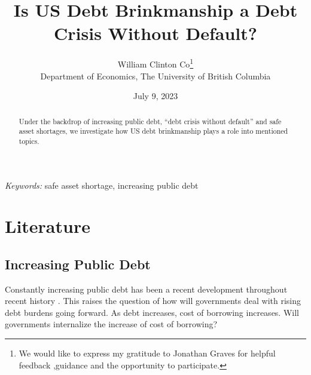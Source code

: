 \documentclass[
  12pt]{article}
\begin{document}
\def\spacingset#1{\renewcommand{\baselinestretch}%
{#1}\small\normalsize} \spacingset{1}



\date{July 9, 2023}
\title{\bf Is US Debt Brinkmanship a Debt Crisis Without Default?}
\author{
William Clinton Co\thanks{We would like to express my gratitude to
Jonathan Graves for helpful feedback ,guidance and the opportunity to
participate.}\\
Department of Economics, The University of British Columbia\\
}
\maketitle

\bigskip
\bigskip
\begin{abstract}
Under the backdrop of increasing public debt, ``debt crisis without
default'' and safe asset shortages, we investigate how US debt
brinkmanship plays a role into mentioned topics.
\end{abstract}

\noindent%
{\it Keywords:} safe asset shortage, increasing public debt
\vfill

\newpage
\spacingset{1.9} %
\ifdefined\Shaded\renewenvironment{Shaded}{\begin{tcolorbox}[boxrule=0pt, breakable, enhanced, sharp corners, interior hidden, frame hidden, borderline west={3pt}{0pt}{shadecolor}]}{\end{tcolorbox}}\fi

\hypertarget{sec-l}{%
\section{Literature}\label{sec-l}}

\hypertarget{increasing-public-debt}{%
\subsection{Increasing Public Debt}\label{increasing-public-debt}}

Constantly increasing public debt has been a recent development
throughout recent history \citep{mitchener2023}. This raises the
question of how will governments deal with rising debt burdens going
forward. As debt increases, cost of borrowing increases. Will
governments internalize the increase of cost of borrowing?
\end{document}

